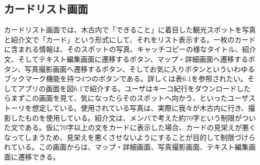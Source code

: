 \subsection{カードリスト画面}
カードリスト画面では、木古内で「できること」に着目した観光スポットを写真と紹介文で「カード」という形式にして、それをリスト表示する。一枚のカードに含まれる情報は、そのスポットの写真、キャッチコピーの様なタイトル、紹介文、そしてテキスト編集画面に遷移するボタン、マップ・詳細画面へ遷移するボタン、写真撮影画面へ遷移するボタン、そしてお気に入りボタンといういわゆるブックマーク機能を持つ4つのボタンである。詳しくは表6.1を参照されたい。そしてアプリの画面を図6.1で紹介する。ユーザはキーコ紀行をダウンロードしたらまずこの画面を見て、気になったらそのスポットへ向かう、といったユーザストーリを想定している。使用されている写真は、実際に我々が木古内に行き、撮影したものを使用している。紹介文は、メンバで考えた約70字という制限がついた文である。仮に70字以上の文をカードに表示した場合、カードの見栄えが悪くなってしまうため、見栄えを悪くさせないようにすることが目的して制限づけられている。この画面からは、マップ・詳細画面、写真撮影画面、テキスト編集画面に遷移できる。

